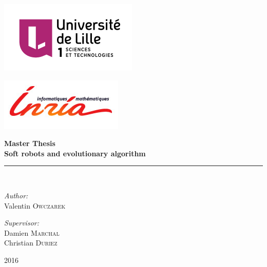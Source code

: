 \newcommand{\HRule}{\rule{\linewidth}{0.5mm}}

\begin{titlepage}
 \begin{center}
        \begin{minipage}{0.4\textwidth}
      \begin{flushleft} \large
        \includegraphics[scale=0.7]{images/univ.png}
      \end{flushleft}
    \end{minipage}
    \begin{minipage}{0.4\textwidth}
      \begin{flushright} \large
        \includegraphics[scale=0.7]{images/inria.jpg}
      \end{flushright}
    \end{minipage}

    \vfill
   
           { \Large \bfseries Master Thesis\\[0.4cm] }
            {\LARGE \bfseries Soft robots and evolutionary algorithm} 
            \HRule \\[1.5cm]
            \begin{minipage}{0.4\textwidth}
              \begin{flushleft}\large
                \emph{Author:}\\
                Valentin \textsc{Owczarek}
              \end{flushleft}
            \end{minipage}
            \begin{minipage}{0.4\textwidth}
              \begin{flushright} \large
                \emph{Supervisor:} \\
                Damien \textsc{Marchal} \\
                Christian \textsc{Duriez}
              \end{flushright}
            \end{minipage}
            \vspace{5mm}
            \vfill
                {\large 2016}
      
  \end{center}
\end{titlepage}
